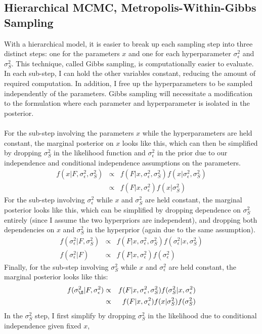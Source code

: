 \documentclass[12pt, letterpaper]{article}
\begin{document}
\subsection{Hierarchical MCMC, Metropolis-Within-Gibbs Sampling}
With a hierarchical model, it is easier to break up each sampling step into three distinct steps: one for the parameters $x$
and one for each hyperparameter $\sigma^2_\epsilon$ and $\sigma^2_S$. This technique, called Gibbs sampling, is computationally easier
to evaluate. In each sub-step, I can hold the other variables constant, reducing the amount of required computation. In addition,
I free up the hyperparameters to be sampled independently of the parameters. Gibbs sampling will necessitate a modification to 
the formulation where each parameter and hyperparameter is isolated in the posterior.
\\\\
For the sub-step involving the parameters $x$ while the hyperparameters are held constant, the marginal posterior on $x$ looks like this,
which can then be simplified by dropping $\sigma^2_S$ in the likelihood function and $\sigma^2_\epsilon$ in the prior
due to our independence and conditional independence assumptions on the parameters.
\begin{eqnarray*}
    f(x | F, \sigma^2_\epsilon, \sigma^2_S) & \propto & f(F | x, \sigma^2_\epsilon, \sigma^2_S) f(x | \sigma^2_\epsilon, \sigma^2_S) \\
                                            & \propto & f(F | x, \sigma^2_\epsilon) f(x | \sigma^2_S)
\end{eqnarray*}
For the sub-step involving $\sigma^2_\epsilon$ while $x$ and $\sigma^2_S$ are held constant, the marginal posterior looks like this,
which can be simplified by dropping dependence on $\sigma^2_S$ entirely (since I assume the two hyperpriors are independent),
and dropping both dependencies on $x$ and $\sigma^2_S$ in the hyperprior (again due to the same assumption).
\begin{eqnarray*}
    f(\sigma^2_\epsilon | F, \sigma^2_S) & \propto & f(F | x, \sigma^2_\epsilon, \sigma^2_S) f(\sigma^2_\epsilon | x, \sigma^2_S) \\
    f(\sigma^2_\epsilon | F)             & \propto & f(F | x, \sigma^2_\epsilon) f(\sigma^2_\epsilon)
\end{eqnarray*}
Finally, for the sub-step involving $\sigma^2_S$ while $x$ and $\sigma^2_\epsilon$ are held constant, the marginal posterior
looks like this: 
\begin{eqnarray*}
    f(\sigma^2_\S | F, \sigma^2_\epsilon) & \propto & f(F | x, \sigma^2_\epsilon, \sigma^2_S) f(\sigma^2_S | x, \sigma^2_\epsilon) \\
                                          & \propto & f(F | x, \sigma^2_\epsilon) f(x | \sigma^2_S) f(\sigma^2_S)
\end{eqnarray*}
In the $\sigma^2_S$ step, I first simplify by dropping $\sigma^2_S$ in the likelihood due to conditional independence given fixed $x$,
\end{document}
